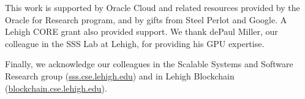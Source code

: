 \documentclass[sigconf]{acmart}
\begin{document}



\begin{acks}
This work is supported by Oracle Cloud and related resources provided by the
Oracle for Research program, and by gifts from Steel Perlot and  Google.
A Lehigh CORE grant also provided support.  
We thank dePaul Miller, our colleague in the SSS Lab at Lehigh, for providing his
GPU expertise.

Finally, we acknowledge our colleagues in the Scalable Systems and Software Research group (\url{sss.cse.lehigh.edu}) and in Lehigh Blockchain (\url{blockchain.cse.lehigh.edu}).
\end{acks}



\end{document}
